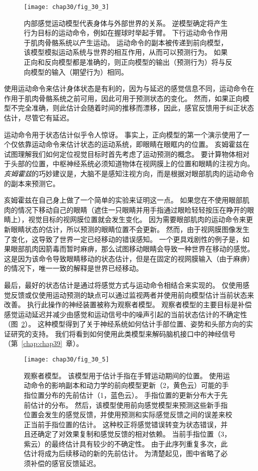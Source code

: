 \begin{figure}[htbp]
	\centering
	\texttt{[image: chap30/fig\_30\_3]}
	\caption{内部感觉运动模型代表身体与外部世界的关系。
		逆模型确定将产生行为目标的运动命令，例如在握球时举起手臂。
		下行运动命令作用于肌肉骨骼系统以产生运动。
		运动命令的副本被传递到前向模型，该模型模拟运动系统与世界的相互作用，从而可以预测行为。
		如果正向和反向模型都是准确的，则正向模型的输出（预测行为）将与反向模型的输入（期望行为）相同。}
	\label{fig:30_3}
\end{figure}


使用运动命令来估计身体状态是有利的，因为与延迟的感觉信息不同，运动命令在作用于肌肉骨骼系统之前可用，因此可用于预测状态的变化。
然而，如果正向模型不完全准确，则此估计会随着时间的推移而漂移，因此，感官反馈用于纠正状态估计，尽管它有延迟。


运动命令用于状态估计似乎令人惊讶。
事实上，正向模型的第一个演示使用了一个仅依靠运动命令来估计状态的运动系统，即眼睛在眼眶内的位置。
亥姆霍兹在试图理解我们如何定位视觉目标时首先考虑了运动预测的概念。
要计算物体相对于头部的位置，中枢神经系统必须知道物体在视网膜上的位置和眼睛的注视方向。
\textit{亥姆霍兹}的巧妙建议是，大脑不是感知注视方向，而是根据对眼部肌肉的运动命令的副本来预测它。


亥姆霍兹在自己身上做了一个简单的实验来证明这一点。
如果您在不使用眼部肌肉的情况下移动自己的眼睛（遮住一只眼睛并用手指通过眼睑轻轻按压在睁开的眼睛上），视觉目标的视网膜位置就会发生变化。
因为需要眼部肌肉的运动命令来更新眼睛状态的估计，所以预测的眼睛位置不会更新。
然而，由于视网膜图像发生了变化，这导致了世界一定已经移动的错误感知。
一个更具戏剧性的例子是，如果眼部肌肉因箭毒而暂时麻痹，那么试图移动眼睛会导致一种世界在移动的感觉。
这是因为该命令导致眼睛移动的状态估计，但是在固定的视网膜输入（由于麻痹）的情况下，唯一一致的解释是世界已经移动。


最后，最好的状态估计是通过将感觉方式与运动命令相结合来实现的。
仅使用感觉反馈或仅使用运动预测的缺点可以通过监视两者并使用前向模型估计当前状态来改善。
执行此操作的神经装置被称为观察者模型。
观察者模型的主要目标是补偿感觉运动延迟并减少由感觉和运动信号中的噪声引起的当前状态估计的不确定性（图~\ref{fig:30_5}）。
这种模型得到了关于神经系统如何估计手部位置、姿势和头部方向的实证研究的支持。
我们将看到如何使用此类模型来解码脑机接口中的神经信号（第~\ref{chap:chap39}~章）。


\begin{figure}[htbp]
	\centering
	\texttt{[image: chap30/fig\_30\_5]}
	\caption{观察者模型。
		该模型用于估计手指在手臂运动期间的位置。
		使用运动命令的影响副本和动力学的前向模型更新（2，黄色云）可能的手指位置分布的先前估计（1，蓝色云）。
		手指位置的更新分布大于先前估计的分布。
		然后，该模型使用前向感觉模型来预测这些新手指位置会发生的感觉反馈，并使用预测和实际感觉反馈之间的误差来校正当前手指位置的估计。
		这种校正将感觉错误转变为状态错误，并且还确定了对效果复制和感觉反馈的相对依赖。
		当前手指位置（3，紫云）的最终估计具有较少的不确定性。
		由于此序列重复多次，此估计将成为后续移动的新的先前估计。
		为清楚起见，图中省略了必须补偿的感官反馈延迟。}
	\label{fig:30_5}
\end{figure}


